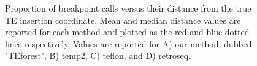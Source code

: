 \begin{figure}
    \centering
    \caption[Accuracy of breakpoint identification for candidate TEs.]{Proportion of breakpoint calls versus their distance from the true TE insertion coordinate. Mean and median distance values are reported for each method and plotted as the red and blue dotted lines respectively. Values are reported for A) our method, dubbed "TEforest", B) temp2, C) teflon, and D) retroseq.}
    \label{fig:tebps}
\end{figure}

